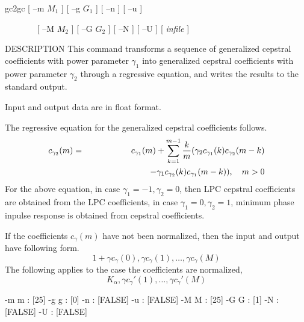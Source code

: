 
\begin{synopsis}
\item [gc2gc] [ --m $M_1$ ] [ --g $G_1$ ] [ --n ] [ --u ] 
\item [\ ~~~~~~]  [ --M $M_2$ ] [ --G $G_2$ ] [ --N ] [ --U ] [ {\em infile} ]
\end{synopsis}

\begin{qsection}{DESCRIPTION}
This command transforms a sequence of generalized cepstral coefficients
with power parameter $\gamma_1$ into generalized cepstral coefficients
with power parameter $\gamma_2$ through a regressive equation,
and writes the results to the standard output.
\par
Input and output data are in float format.
\par
The regressive equation for the generalized cepstral coefficients 
follows.
\begin{eqnarray*}
  c_{\gamma_2}(m) &=& c_{\gamma_1}(m) + \sum_{k=1}^{m-1}\frac{k}{m}
		      (\gamma_2 c_{\gamma_1}(k)c_{\gamma_2}(m-k) \nonumber\\
     		  & & \hspace{25mm} -\gamma_1 c_{\gamma_2}(k)
			c_{\gamma_1}(m-k)), ~~~m>0
\end{eqnarray*}
For the above equation, in case $\gamma_1=-1, \gamma_2=0$,
then LPC cepstral coefficients are obtained from the LPC coefficients,
in case $\gamma_1=0, \gamma_2=1$, minimum phase inpulse response is
obtained from cepstral coefficients.

If the coefficients $c_\gamma(m)$ have not been normalized,
then the input and output have following form.
\begin{displaymath}
1+\gamma c_\gamma(0), \gamma c_\gamma(1), \ldots, \gamma c_\gamma(M)
\end{displaymath}
The following applies to the case the coefficients are normalized,
\begin{displaymath}
K_\alpha,\gamma c_\gamma'(1),\ldots, \gamma c_\gamma'(M)
\end{displaymath}

\end{qsection}

\begin{options}
       -m m  :   [25]
       -g g  :   [0]
       -n    :     [FALSE]
       -u    :     [FALSE]
       -M M  :  [25]
       -G G  :  [1]
       -N    :    [FALSE]
       -U    :    [FALSE]
\end{options}

